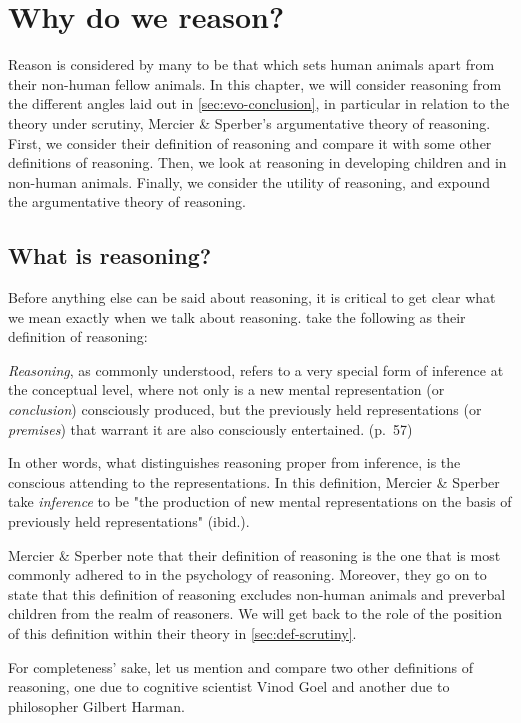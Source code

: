 \chapter{Why do we reason?}
\label{ch:reasoning}

Reason is considered by many to be that which sets human animals apart from their non-human fellow animals. In this chapter, we will consider reasoning from the different angles laid out in \cref{sec:evo-conclusion}, in particular in relation to the theory under scrutiny, Mercier \& Sperber's argumentative theory of reasoning. First, we consider their definition of reasoning and compare it with some other definitions of reasoning. Then, we look at reasoning in developing children and in non-human animals. Finally, we consider the utility of reasoning, and expound the argumentative theory of reasoning.

\section{What is reasoning?}

Before anything else can be said about reasoning, it is critical to get clear what we mean exactly when we talk about reasoning. \citet{MS11} take the following as their definition of reasoning:

\begin{quoting}
    \emph{Reasoning}, as commonly understood, refers to a very special form of inference at the conceptual level, where not only is a new mental representation (or \emph{conclusion}) consciously produced, but the previously held representations (or \emph{premises}) that warrant it are also consciously entertained.
    \hfill (p.~57)
\end{quoting}
In other words, what distinguishes reasoning proper  from inference, is the conscious attending to the representations.
In this definition, Mercier \& Sperber take \emph{inference} to be "the production of new mental representations on the basis of previously held representations" (ibid.).

Mercier \& Sperber note that their definition of reasoning is the one that is most commonly adhered to in the psychology of reasoning.
Moreover, they go on to state that this definition of reasoning excludes non-human animals and preverbal children from the realm of reasoners.
We will get back to the role of the position of this definition within their theory in \cref{sec:def-scrutiny}.

For completeness' sake, let us mention and compare two other definitions of reasoning, one due to cognitive scientist Vinod Goel and another due to philosopher Gilbert Harman.

